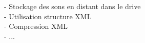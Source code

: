 - Stockage des sons en distant dans le drive\\
- Utilisation structure XML\\
- Compression XML\\
- ...\\